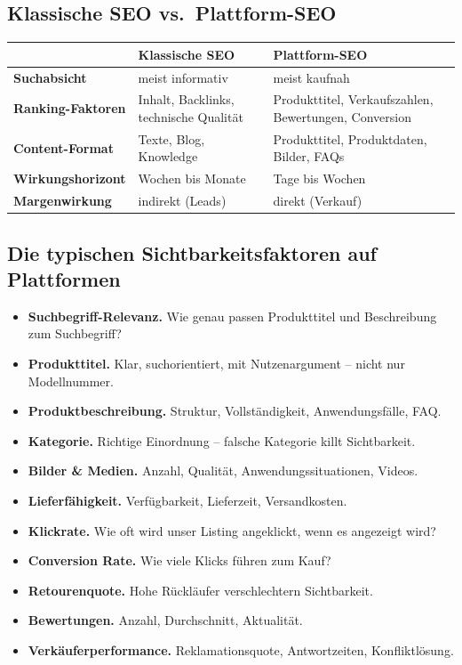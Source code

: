 \documentclass[11pt,a4paper,oneside]{article}
\begin{document}
\subsection{Klassische SEO vs.\ Plattform-SEO}

\begin{tabularx}{\linewidth}{@{}lXX@{}}
\toprule
& \textbf{Klassische SEO} & \textbf{Plattform-SEO} \\
\midrule
\textbf{Suchabsicht} & meist informativ & meist kaufnah \\
\textbf{Ranking-Faktoren} & Inhalt, Backlinks, technische Qualität & Produkttitel, Verkaufszahlen, Bewertungen, Conversion \\
\textbf{Content-Format} & Texte, Blog, Knowledge & Produkttitel, Produktdaten, Bilder, FAQs \\
\textbf{Wirkungshorizont} & Wochen bis Monate & Tage bis Wochen \\
\textbf{Margenwirkung} & indirekt (Leads) & direkt (Verkauf) \\
\bottomrule
\end{tabularx}

\subsection{Die typischen Sichtbarkeitsfaktoren auf Plattformen}

\begin{itemize}
  \item \textbf{Suchbegriff-Relevanz.} Wie genau passen Produkttitel und Beschreibung zum Suchbegriff?
  \item \textbf{Produkttitel.} Klar, suchorientiert, mit Nutzenargument -- nicht nur Modellnummer.
  \item \textbf{Produktbeschreibung.} Struktur, Vollständigkeit, Anwendungsfälle, FAQ.
  \item \textbf{Kategorie.} Richtige Einordnung -- falsche Kategorie killt Sichtbarkeit.
  \item \textbf{Bilder \& Medien.} Anzahl, Qualität, Anwendungssituationen, Videos.
  \item \textbf{Lieferfähigkeit.} Verfügbarkeit, Lieferzeit, Versandkosten.
  \item \textbf{Klickrate.} Wie oft wird unser Listing angeklickt, wenn es angezeigt wird?
  \item \textbf{Conversion Rate.} Wie viele Klicks führen zum Kauf?
  \item \textbf{Retourenquote.} Hohe Rückläufer verschlechtern Sichtbarkeit.
  \item \textbf{Bewertungen.} Anzahl, Durchschnitt, Aktualität.
  \item \textbf{Verkäuferperformance.} Reklamationsquote, Antwortzeiten, Konfliktlösung.
\end{itemize}
\end{document}
